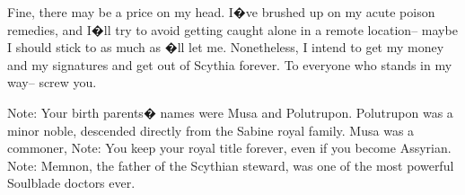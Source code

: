\documentclass[char]{Kos}
\begin{document}
Fine, there may be a price on my head. I�ve brushed up on my acute poison remedies, and I�ll try to avoid getting caught alone in a remote location-- maybe I should stick to \cPoet{\nickname} as much as \cPoet{\they}�ll let me. Nonetheless, I intend to get my money and my signatures and get out of Scythia forever. To everyone who stands in my way-- screw you.


Note: Your birth parents� names were Musa and Polutrupon. Polutrupon was a minor noble, descended directly from the Sabine royal family. Musa was a commoner, 
Note: You keep your royal title forever, even if you become Assyrian.
Note: Memnon, the father of the Scythian steward, was one of the most powerful Soulblade doctors ever.
\end{document}
